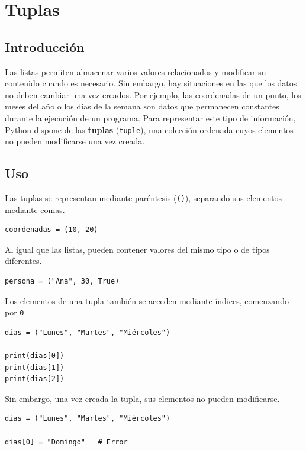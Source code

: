 \documentclass[11pt,a5paper,twoside]{book}
\begin{document}
\newpage

\section{Tuplas}
\subsection{Introducción}
Las listas permiten almacenar varios valores relacionados y modificar su contenido cuando es necesario. Sin embargo, hay situaciones en las que los datos no deben cambiar una vez creados.
Por ejemplo, las coordenadas de un punto, los meses del año o los días de la semana son datos que permanecen constantes durante la ejecución de un programa.
Para representar este tipo de información, Python dispone de las \textbf{tuplas} ({\scriptsize \texttt{tuple}}), una colección ordenada cuyos elementos no pueden modificarse una vez creada.
\subsection{Uso}
Las tuplas se representan mediante paréntesis ({\scriptsize \texttt{()}}), separando sus elementos mediante comas.


\begin{tcolorbox}
\scriptsize
 \begin{verbatim}
coordenadas = (10, 20)
\end{verbatim}
\end{tcolorbox}
Al igual que las listas, pueden contener valores del mismo tipo o de tipos diferentes.


\begin{tcolorbox}
\scriptsize
 \begin{verbatim}
persona = ("Ana", 30, True)
\end{verbatim}
\end{tcolorbox}
Los elementos de una tupla también se acceden mediante índices, comenzando por {\scriptsize \texttt{0}}.


\begin{tcolorbox}
\scriptsize
 \begin{verbatim}
dias = ("Lunes", "Martes", "Miércoles")

print(dias[0])
print(dias[1])
print(dias[2])
\end{verbatim}
\end{tcolorbox}
Sin embargo, una vez creada la tupla, sus elementos no pueden modificarse.


\begin{tcolorbox}
\scriptsize
 \begin{verbatim}
dias = ("Lunes", "Martes", "Miércoles")

dias[0] = "Domingo"   # Error
\end{verbatim}
\end{tcolorbox}
\end{document}
